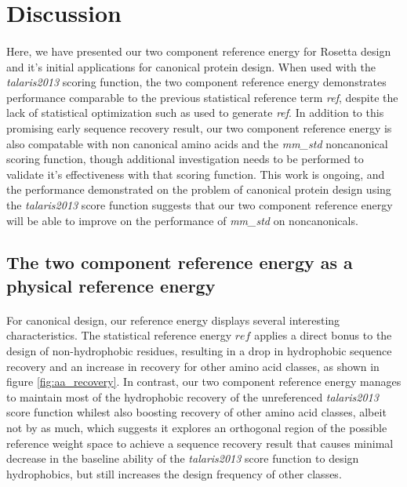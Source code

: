 \section{Discussion}

\paragraph{}
Here, we have presented our two component reference energy for Rosetta design and it's initial applications for canonical protein design.
When used with the \textit{talaris2013} scoring function, the two component reference energy demonstrates performance comparable to the previous statistical reference term \textit{ref}, despite the lack of statistical optimization such as used to generate \textit{ref}\cite{leaver-fay_chapter_2013}.
In addition to this promising early sequence recovery result, our two component reference energy is also compatable with non canonical amino acids and the \textit{mm\_std} noncanonical scoring function, though additional investigation needs to be performed to validate it's effectiveness with that scoring function.
This work is ongoing, and the performance demonstrated on the problem of canonical protein design using the \textit{talaris2013} score function suggests that our two component reference energy will be able to improve on the performance of \textit{mm\_std} on noncanonicals.

\subsection{The two component reference energy as a physical reference energy}
\paragraph{}
For canonical design, our reference energy displays several interesting characteristics.
The statistical reference energy $ref$ applies a direct bonus to the design of non-hydrophobic residues, resulting in a drop in hydrophobic sequence recovery and an increase in recovery for other amino acid classes, as shown in figure \ref{fig:aa_recovery}.
In contrast, our two component reference energy manages to maintain most of the hydrophobic recovery of the unreferenced \textit{talaris2013} score function whilest also boosting recovery of other amino acid classes, albeit not by as much, which suggests it explores an orthogonal region of the possible reference weight space to achieve a sequence recovery result that causes minimal decrease in the baseline ability of the \textit{talaris2013} score function to design hydrophobics, but still increases the design frequency of other classes.

